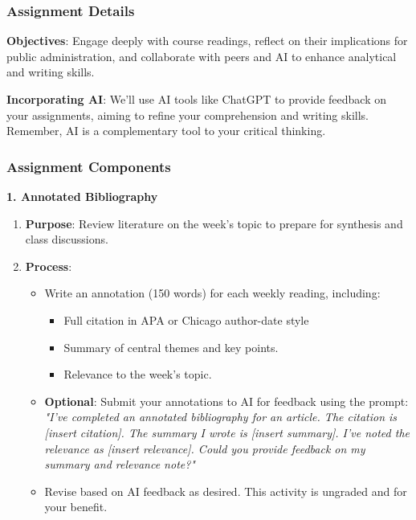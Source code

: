 \documentclass[12pt, letterpaper]{article}
\begin{document}
\subsubsection*{Assignment Details}

\textbf{Objectives}: Engage deeply with course readings, reflect on their implications for public administration, and collaborate with peers and AI to enhance analytical and writing skills.

\textbf{Incorporating AI}: We'll use AI tools like ChatGPT to provide feedback on your assignments, aiming to refine your comprehension and writing skills. Remember, AI is a complementary tool to your critical thinking.

\subsubsection*{Assignment Components}

\textbf{1. Annotated Bibliography}

\begin{enumerate}
    \item \textbf{Purpose}: Review literature on the week's topic to prepare for synthesis and class discussions.
    \item \textbf{Process}:
    \begin{itemize}
        \item Write an annotation (150 words) for each weekly reading, including:
        \begin{itemize}
            \item Full citation in APA or Chicago author-date style
            \item Summary of central themes and key points.
            \item Relevance to the week's topic.
        \end{itemize}
        \item \textbf{Optional}: Submit your annotations to AI for feedback using the prompt:
        \textit{"I've completed an annotated bibliography for an article. The citation is [insert citation]. The summary I wrote is [insert summary]. I've noted the relevance as [insert relevance]. Could you provide feedback on my summary and relevance note?"}
        \item Revise based on AI feedback as desired. This activity is ungraded and for your benefit.
    \end{itemize}
\end{enumerate}
\end{document}
